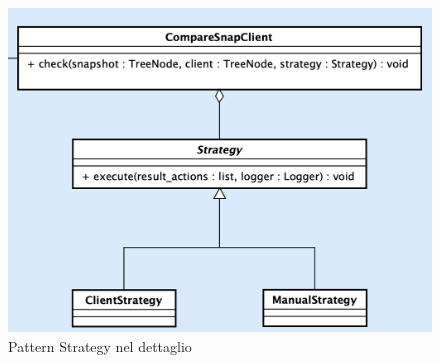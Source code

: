 \begin{figure}[H]
    \centering
    \includegraphics[scale = 0.38]{components/img/strategy-model.png}
    \caption{Pattern Strategy nel dettaglio}
    \label{fig:Pattern proxy nel dettaglio}
\end{figure}
